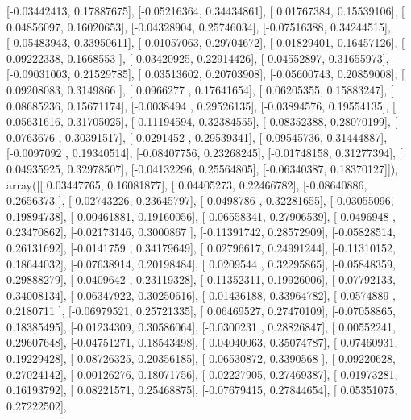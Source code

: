 \documentclass{article}
\begin{document}
       [-0.03442413,  0.17887675],
       [-0.05216364,  0.34434861],
       [ 0.01767384,  0.15539106],
       [ 0.04856097,  0.16020653],
       [-0.04328904,  0.25746034],
       [-0.07516388,  0.34244515],
       [-0.05483943,  0.33950611],
       [ 0.01057063,  0.29704672],
       [-0.01829401,  0.16457126],
       [ 0.09222338,  0.1668553 ],
       [ 0.03420925,  0.22914426],
       [-0.04552897,  0.31655973],
       [-0.09031003,  0.21529785],
       [ 0.03513602,  0.20703908],
       [-0.05600743,  0.20859008],
       [ 0.09208083,  0.3149866 ],
       [ 0.0966277 ,  0.17641654],
       [ 0.06205355,  0.15883247],
       [ 0.08685236,  0.15671174],
       [-0.0038494 ,  0.29526135],
       [-0.03894576,  0.19554135],
       [ 0.05631616,  0.31705025],
       [ 0.11194594,  0.32384555],
       [-0.08352388,  0.28070199],
       [ 0.0763676 ,  0.30391517],
       [-0.0291452 ,  0.29539341],
       [-0.09545736,  0.31444887],
       [-0.0097092 ,  0.19340514],
       [-0.08407756,  0.23268245],
       [-0.01748158,  0.31277394],
       [ 0.04935925,  0.32978507],
       [-0.04132296,  0.25564805],
       [-0.06340387,  0.18370127]]), array([[ 0.03447765,  0.16081877],
       [ 0.04405273,  0.22466782],
       [-0.08640886,  0.2656373 ],
       [ 0.02743226,  0.23645797],
       [ 0.0498786 ,  0.32281655],
       [ 0.03055096,  0.19894738],
       [ 0.00461881,  0.19160056],
       [ 0.06558341,  0.27906539],
       [ 0.0496948 ,  0.23470862],
       [-0.02173146,  0.3000867 ],
       [-0.11391742,  0.28572909],
       [-0.05828514,  0.26131692],
       [-0.0141759 ,  0.34179649],
       [ 0.02796617,  0.24991244],
       [-0.11310152,  0.18644032],
       [-0.07638914,  0.20198484],
       [ 0.0209544 ,  0.32295865],
       [-0.05848359,  0.29888279],
       [ 0.0409642 ,  0.23119328],
       [-0.11352311,  0.19926006],
       [ 0.07792133,  0.34008134],
       [ 0.06347922,  0.30250616],
       [ 0.01436188,  0.33964782],
       [-0.0574889 ,  0.2180711 ],
       [-0.06979521,  0.25721335],
       [ 0.06469527,  0.27470109],
       [-0.07058865,  0.18385495],
       [-0.01234309,  0.30586064],
       [-0.0300231 ,  0.28826847],
       [ 0.00552241,  0.29607648],
       [-0.04751271,  0.18543498],
       [ 0.04040063,  0.35074787],
       [ 0.07460931,  0.19229428],
       [-0.08726325,  0.20356185],
       [-0.06530872,  0.3390568 ],
       [ 0.09220628,  0.27024142],
       [-0.00126276,  0.18071756],
       [ 0.02227905,  0.27469387],
       [-0.01973281,  0.16193792],
       [ 0.08221571,  0.25468875],
       [-0.07679415,  0.27844654],
       [ 0.05351075,  0.27222502],
\end{document}
